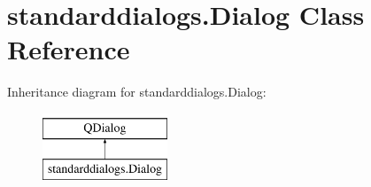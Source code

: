 \hypertarget{classstandarddialogs_1_1Dialog}{}\section{standarddialogs.\+Dialog Class Reference}
\label{classstandarddialogs_1_1Dialog}
Inheritance diagram for standarddialogs.\+Dialog\+:\begin{figure}[H]
\begin{center}
\leavevmode
\includegraphics[height=2.000000cm]{classstandarddialogs_1_1Dialog}
\end{center}
\end{figure}
